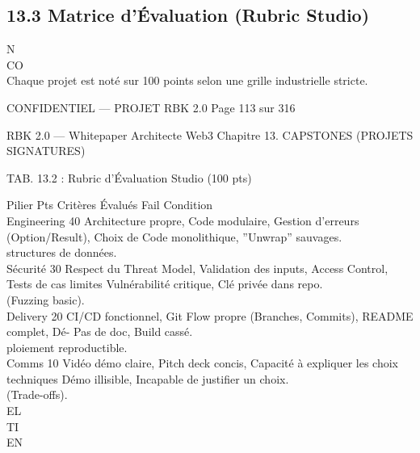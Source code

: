 \subsection{13.3 Matrice d’Évaluation (Rubric Studio)}
N\\
CO\\
Chaque projet est noté sur 100 points selon une grille industrielle stricte.\\
\vspace{0.5em}
\vspace{0.5em}
\vspace{0.5em}
\vspace{0.5em}
\begin{confidential}CONFIDENTIEL — PROJET RBK 2.0                                 Page 113 sur 316\end{confidential}
RBK 2.0 — Whitepaper Architecte Web3                                                          Chapitre 13. CAPSTONES (PROJETS SIGNATURES)\\
\vspace{0.5em}
\vspace{0.5em}
\begin{center}\begin{tabular}TAB. 13.2 : Rubric d’Évaluation Studio (100 pts)\end{tabular}\end{center}
\vspace{0.5em}
\vspace{0.5em}
Pilier      Pts Critères Évalués                                                                    Fail Condition\\
Engineering 40 Architecture propre, Code modulaire, Gestion d’erreurs (Option/Result), Choix de Code monolithique, ”Unwrap” sauvages.\\
structures de données.\\
Sécurité    30 Respect du Threat Model, Validation des inputs, Access Control, Tests de cas limites Vulnérabilité critique, Clé privée dans repo.\\
(Fuzzing basic).\\
Delivery    20 CI/CD fonctionnel, Git Flow propre (Branches, Commits), README complet, Dé- Pas de doc, Build cassé.\\
ploiement reproductible.\\
Comms       10 Vidéo démo claire, Pitch deck concis, Capacité à expliquer les choix techniques Démo illisible, Incapable de justifier un choix.\\
(Trade-offs).\\
\vspace{0.5em}
\vspace{0.5em}
\vspace{0.5em}
\vspace{0.5em}
EL\\
TI\\
EN\\
